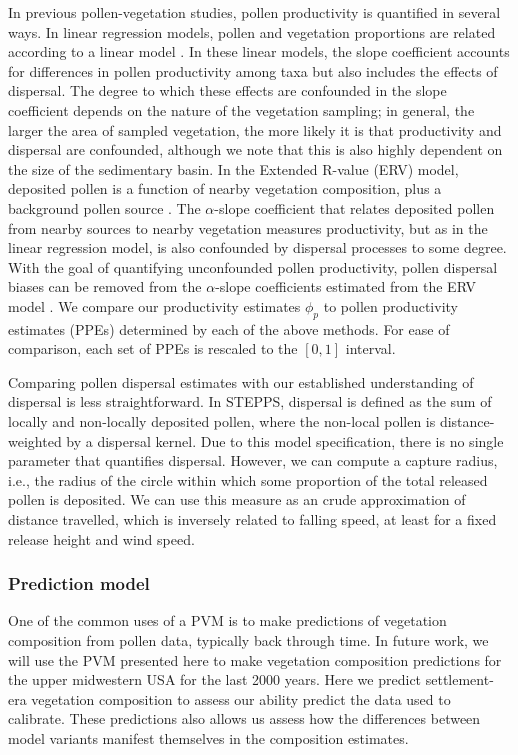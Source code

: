 \documentclass[12pt]{article}
\begin{document}
In previous pollen-vegetation studies, pollen productivity is
quantified in several ways. In linear regression models, pollen and
vegetation proportions are related according to a linear model
\citep{bradshaw1985relationships, jackson1990}. In these linear
models, the slope coefficient accounts for differences in pollen
productivity among taxa but also includes the effects of
dispersal. The degree to which these effects are confounded in the
slope coefficient depends on the nature of the vegetation sampling; in
general, the larger the area of sampled vegetation, the more likely it
is that productivity and dispersal are confounded, although we note
that this is also highly dependent on the size of the sedimentary
basin. In the Extended R-value (ERV) model, deposited pollen is a
function of nearby vegetation composition, plus a background pollen
source \citep{prentice1986, prentice1987quantitative,
  marquer2014holocene, brostrom2008pollen}. The $\alpha$-slope
coefficient that relates deposited pollen from nearby sources to
nearby vegetation measures productivity, but as in the linear
regression model, is also confounded by dispersal processes to some
degree. With the goal of quantifying unconfounded pollen productivity,
pollen dispersal biases can be removed from the $\alpha$-slope
coefficients estimated from the ERV model
\citep{sugita1999landscape}. We compare our productivity estimates
$\phi_p$ to pollen productivity estimates (PPEs) determined by each of
the above methods. For ease of comparison, each set of PPEs is
rescaled to the $[0,1]$ interval.

Comparing pollen dispersal estimates with our established
understanding of dispersal is less straightforward. In STEPPS,
dispersal is defined as the sum of locally and non-locally deposited
pollen, where the non-local pollen is distance-weighted by a dispersal
kernel. Due to this model specification, there is no single parameter
that quantifies dispersal. However, we can compute a capture radius,
i.e., the radius of the circle within which some proportion of the
total released pollen is deposited. We can use this measure as an
crude approximation of distance travelled, which is inversely related
to falling speed, at least for a fixed release height and
wind speed.

\subsubsection{Prediction model}
\label{sec:pred}

One of the common uses of a PVM is to make predictions of vegetation
composition from pollen data, typically back through time. In future
work, we will use the PVM presented here to make vegetation
composition predictions for the upper midwestern USA for the last 2000
years. Here we predict settlement-era vegetation composition to assess
our ability predict the data used to calibrate. These predictions also
allows us assess how the differences between model variants manifest
themselves in the composition estimates.
\end{document}
